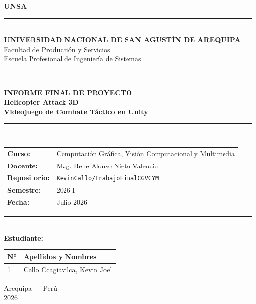\documentclass[12pt,a4paper]{article}
\begin{document}
\begin{titlepage}
  \centering
  \vspace*{0.5cm}

  {\Huge\textcolor{azulUnsa}{\textbf{UNSA}}}\\[0.3cm]
  \rule{\linewidth}{2pt}\\[0.3cm]

  {\large\textbf{UNIVERSIDAD NACIONAL DE SAN AGUSTÍN DE AREQUIPA}}\\[0.2cm]
  {\large Facultad de Producción y Servicios}\\[0.2cm]
  {\large Escuela Profesional de Ingeniería de Sistemas}\\[0.8cm]

  \rule{\linewidth}{0.5pt}\\[0.8cm]

  {\LARGE\textbf{\textcolor{azulUnsa}{INFORME FINAL DE PROYECTO}}}\\[0.5cm]
  {\huge\textbf{Helicopter Attack 3D\\[0.3cm]Videojuego de Combate Táctico en Unity}}\\[0.5cm]

  \rule{\linewidth}{0.5pt}\\[0.8cm]

  \begin{tabular}{ll}
    \textbf{Curso:}        & Computación Gráfica, Visión Computacional y Multimedia \\[0.3cm]
    \textbf{Docente:}      & Mag. Rene Alonso Nieto Valencia \\[0.3cm]
    \textbf{Repositorio:}  & \texttt{KevinCallo/TrabajoFinalCGVCYM} \\[0.3cm]
    \textbf{Semestre:}     & 2026-I \\[0.3cm]
    \textbf{Fecha:}        & Julio 2026 \\
  \end{tabular}

  \vspace{1cm}
  \rule{\linewidth}{0.5pt}\\[0.5cm]

  {\large\textbf{Estudiante:}}\\[0.5cm]

  \begin{tabular}{|l|l|}
    \hline
    \rowcolor{azulUnsa!20}
    \textbf{N°} & \textbf{Apellidos y Nombres} \\
    \hline
    1 & Callo Ccagiavilca, Kevin Joel \\
    \hline
  \end{tabular}

  \vfill
  {\large Arequipa --- Perú\\2026}
\end{titlepage}
\end{document}
